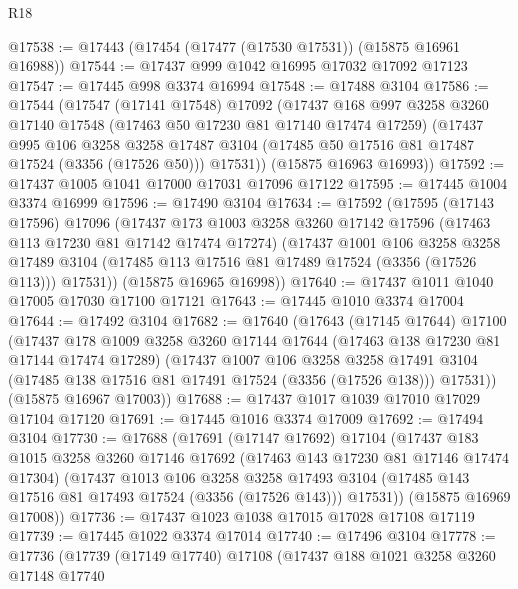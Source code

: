 \begin{lexlean}{R18}
\begin{coremodule}
@17538 := @17443 (@17454 (@17477 (@17530 @17531)) (@15875 @16961 @16988))
@17544 := @17437 @999 @1042 @16995 @17032 @17092 @17123
@17547 := @17445 @998 @3374 @16994
@17548 := @17488 @3104
@17586 := @17544
    (@17547
      (@17141 @17548)
      @17092
      (@17437
        @168
        @997
        @3258
        @3260
        @17140
        @17548
        (@17463 @50 @17230 @81 @17140 @17474 @17259)
        (@17437
          @995
          @106
          @3258
          @3258
          @17487
          @3104
          (@17485 @50 @17516 @81 @17487 @17524 (@3356 (@17526 @50)))
          @17531))
      (@15875 @16963 @16993))
@17592 := @17437 @1005 @1041 @17000 @17031 @17096 @17122
@17595 := @17445 @1004 @3374 @16999
@17596 := @17490 @3104
@17634 := @17592
    (@17595
      (@17143 @17596)
      @17096
      (@17437
        @173
        @1003
        @3258
        @3260
        @17142
        @17596
        (@17463 @113 @17230 @81 @17142 @17474 @17274)
        (@17437
          @1001
          @106
          @3258
          @3258
          @17489
          @3104
          (@17485 @113 @17516 @81 @17489 @17524 (@3356 (@17526 @113)))
          @17531))
      (@15875 @16965 @16998))
@17640 := @17437 @1011 @1040 @17005 @17030 @17100 @17121
@17643 := @17445 @1010 @3374 @17004
@17644 := @17492 @3104
@17682 := @17640
    (@17643
      (@17145 @17644)
      @17100
      (@17437
        @178
        @1009
        @3258
        @3260
        @17144
        @17644
        (@17463 @138 @17230 @81 @17144 @17474 @17289)
        (@17437
          @1007
          @106
          @3258
          @3258
          @17491
          @3104
          (@17485 @138 @17516 @81 @17491 @17524 (@3356 (@17526 @138)))
          @17531))
      (@15875 @16967 @17003))
@17688 := @17437 @1017 @1039 @17010 @17029 @17104 @17120
@17691 := @17445 @1016 @3374 @17009
@17692 := @17494 @3104
@17730 := @17688
    (@17691
      (@17147 @17692)
      @17104
      (@17437
        @183
        @1015
        @3258
        @3260
        @17146
        @17692
        (@17463 @143 @17230 @81 @17146 @17474 @17304)
        (@17437
          @1013
          @106
          @3258
          @3258
          @17493
          @3104
          (@17485 @143 @17516 @81 @17493 @17524 (@3356 (@17526 @143)))
          @17531))
      (@15875 @16969 @17008))
@17736 := @17437 @1023 @1038 @17015 @17028 @17108 @17119
@17739 := @17445 @1022 @3374 @17014
@17740 := @17496 @3104
@17778 := @17736
    (@17739
      (@17149 @17740)
      @17108
      (@17437
        @188
        @1021
        @3258
        @3260
        @17148
        @17740

\end{coremodule}
\end{lexlean}
